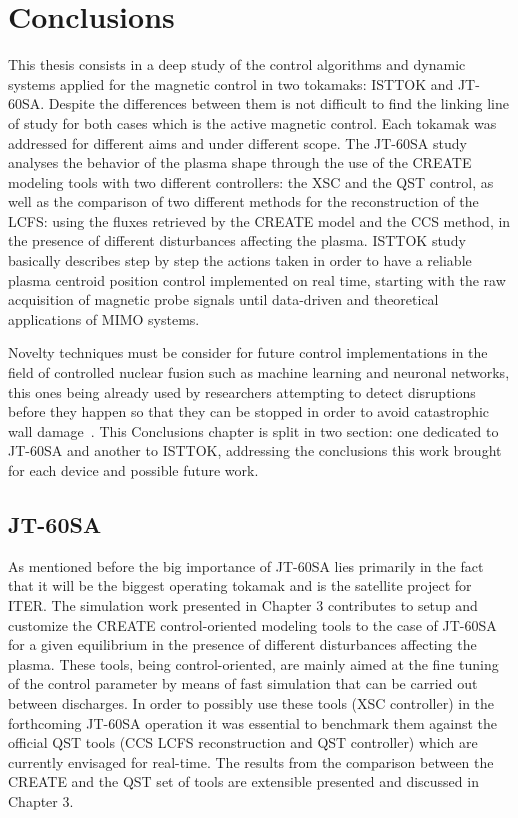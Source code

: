 \chapter{Conclusions}

This thesis consists in a deep study of the control algorithms and dynamic systems applied for the magnetic control in two tokamaks: ISTTOK and JT-60SA. Despite the  differences between them is not difficult to find the  linking line of study for both cases which is the active magnetic control. Each tokamak was addressed for different aims and under different scope. The JT-60SA study analyses the behavior of the plasma shape through the use of the CREATE modeling tools with two different controllers: the XSC and the QST control, as well as the comparison of two different methods for the reconstruction of the LCFS: using the fluxes retrieved by the CREATE model and the CCS method, in the presence of different disturbances affecting the plasma. ISTTOK study basically describes step by step the actions taken in order to have a reliable plasma centroid position control implemented on real time, starting with the raw acquisition of magnetic probe signals until  data-driven and theoretical applications of MIMO systems. \smallskip

Novelty techniques must be consider for future control implementations in the field of controlled nuclear fusion  such as machine learning and neuronal networks, this ones being already  used by researchers  attempting to detect disruptions before they happen so that they can be stopped in order to avoid catastrophic wall damage~\cite[Chapter~6]{Paluszek2020}. This Conclusions chapter is split in two section: one dedicated to JT-60SA and another to ISTTOK, addressing the conclusions  this work brought for each device and possible future work.

\section{JT-60SA}

As mentioned before the big importance of JT-60SA  lies primarily in the fact that it will be the biggest operating tokamak and is the satellite project for ITER. The simulation work presented in Chapter 3 contributes to setup and customize the CREATE control-oriented modeling tools to the case of JT-60SA for a given equilibrium in the presence of different disturbances affecting the plasma. These tools, being control-oriented, are mainly aimed at the fine tuning of the control parameter by means of fast simulation that can be carried out between discharges. In order to possibly use these tools (XSC controller) in the forthcoming JT-60SA operation it was essential to benchmark them against the official QST tools (CCS LCFS reconstruction and QST controller) which are currently envisaged for real-time. The results from the comparison between the CREATE and the QST set of tools are extensible presented and discussed in Chapter 3.\smallskip


